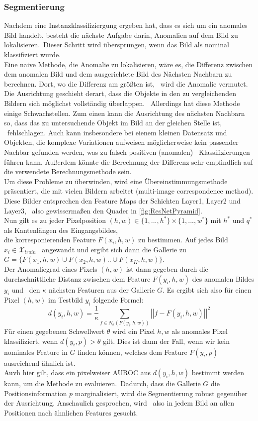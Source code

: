 \subsubsection*{Segmentierung}
Nachdem eine Instanzklassifiziergung ergeben hat, dass es sich um ein anomales Bild handelt, besteht die nächste Aufgabe darin, Anomalien auf dem Bild zu lokalisieren.\
Dieser Schritt wird übersprungen, wenn das Bild als nominal klassifiziert wurde.\\
Eine naive Methode, die Anomalie zu lokalisieren, wäre es, die Differenz zwischen dem anomalen Bild und dem ausgerichtete Bild des Nächsten Nachbarn zu berechnen. Dort, wo die Differenz am größten ist, \
wird die Anomalie vermutet. Die Ausrichtung geschieht derart, dass die Objekte in den zu vergleichenden Bildern sich möglichst vollständig überlappen. \ 
Allerdings hat diese Methode einige Schwachstellen. Zum einen kann die Ausrichtung des nächsten Nachbarn so, dass das zu untersuchende Objekt im Bild an der gleichen Stelle ist, \
fehlschlagen. Auch kann insbesondere bei eienem kleinen Datensatz und Objekten, die komplexe Variationen aufweisen möglicherweise kein passender Nachbar gefunden werden, was zu falsch positiven (anomalen) \
Klassifizierungen führen kann. Außerdem könnte die Berechnung der Differenz sehr empfindlich auf die verwendete Berechnungsmethode sein. \\ 
Um diese Probleme zu überwinden, wird eine Übereinstimmungsmethode präsentiert, die mit vielen \glqq Bildern\grqq{} arbeitet (\glqq multi-image correspondence method\grqq{}). Diese Bilder entsprechen den Feature Maps der Schichten Layer1, Layer2 und Layer3, \
also gewissermaßen den Quader in \ref{fig:ResNetPyramid}.\\
Nun gilt es zu jeder Pixelposition $(h,w)\in \{1,...,h^{*}\}\times\{1,...,w^{*}\}$ mit $h^{*}$ und $q^{*}$ als Kantenlängen des Eingangsbildes, \\ 
die korresponierenden Feature $F(x_{i}, h,w)$ zu bestimmen. Auf jedes Bild $x_{i}\in\mathcal{X}_{train}$ \
angewandt und ergibt sich dann die \glqq Gallerie\grqq{} zu $G = \{ {F(x_{1}, h, w)}\cup {F(x_{2},h,w)} .. \cup {F(x_{K},h,w)} \}$.\\
Der Anomaliegrad eines Pixels $(h,w)$ ist dann gegeben durch die durchschnittliche Distanz zwischen dem Feature $F(y_{i},h,w)$ des anomalen Bildes $y_{i}$ und \ 
den $\kappa$ nächsten Featuren aus der Gallerie $G$. Es ergibt sich also für einen Pixel $(h,w)$ im Testbild $y_{i}$ folgende Formel: \
$$
d(y_{i},h,w) = \frac{1}{\kappa} \sum_{f\in N_{\kappa}(F(y_{i},h,w))} \left|\left| f - F(y_{i},h,w) \right|\right|^{2}
$$
Für einen gegebenen Schwellwert $\theta$ wird ein Pixel $h,w$ als anomales Pixel klassifiziert, wenn $d(y_{i},p) > \theta$ gilt.
Dies ist dann der Fall, wenn wir kein nominales Feature in $G$ finden können, welches dem Feature $F(y_{i},p)$ ausreichend ähnlich ist.\\
Auvh hier gilt, dass ein pixelweiser AUROC aus $d(y_{i},h,w)$ bestimmt werden kann, um die Methode zu evaluieren.\
Dadurch, dass die Gallerie $G$ die Positionsinformation $p$ marginalisiert, wird die Segmentierung robust gegenüber der Ausrichtung. Anschaulich gesprochen, wird \
also in jedem Bild an allen Positionen nach ähnlichen Features gesucht.
